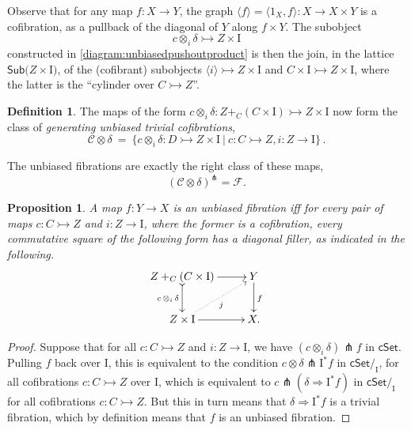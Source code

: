 \documentclass[11pt]{amsart}
\newcommand{\cSet}{\ensuremath{\mathsf{cSet}}}
\newcommand{\mono}{\ensuremath{\rightarrowtail}}
\newcommand{\ra}{\ensuremath{\rightarrow}}
\renewcommand{\to}{\ensuremath{\rightarrow}}
\newcommand{\gph}[1]{\ensuremath{\langle #1 \rangle}}
\newcommand{\Sub}[1]{\ensuremath{\mathsf{Sub}{#1}}}
\newcommand{\I}{\ensuremath{\mathrm{I}}}
\newtheorem{proposition}[theorem]{Proposition}
\theoremstyle{remark}
\theoremstyle{definition}
\newtheorem{definition}[theorem]{Definition}
\begin{document}
Observe that for any map $f : X\to Y$, the graph $\gph{f} = \langle 1_X, f \rangle : X \to X\times Y$ is a cofibration, as a pullback of the diagonal of $Y$ along $f\times Y$.  The subobject $$c \otimes_i\!\delta \mono Z\times \I$$ constructed in \eqref{diagram:unbiasedpushoutproduct} is then the join, in the lattice $\Sub(Z\times \I)$, of the (cofibrant) subobjects $\gph{i} \mono Z\times \I$ and $C\times \I \mono Z\times \I$, where the latter is the ``cylinder over $C\mono Z$''.

\begin{definition}\label{def:genunbiasedtrivcof}
The maps of the form $c\otimes_i\delta : Z +_C (C\times\I) \mono Z\times\I$  now form the class of \emph{generating unbiased trivial cofibrations},
\begin{equation}\label{eq:generatingtrivialcofibrations}
\mathcal{C}\otimes\delta\ =\ \{ c \otimes_i \delta : D \mono Z \times \I\ |\ c : C\mono Z, i:Z\ra\I \}\,.
\end{equation}
\end{definition}

The unbiased fibrations are exactly the right class of these maps,
\[
(\mathcal{C}\otimes\delta)^{\pitchfork} = \mathcal{F}.
\]
\begin{proposition}\label{prop:fibiffrlp}
A map $f: Y\ra X$ is an unbiased fibration iff for every pair of maps $c : C\mono Z$ and $i:Z\ra\I$, where the former is a cofibration, every commutative square of the following form has a diagonal filler, as indicated in the following.
\begin{equation}\label{diagram:unbiasedfibration}
\xymatrix{
Z +_C (C\times\I) \ar@{>->}[d]_{c\, \otimes_i\, \delta} \ar[r] & Y \ar[d]^f \\
Z\times \I \ar@{.>}[ru]_{j} \ar[r] & X.
}
\end{equation}
\end{proposition}

\begin{proof}
Suppose that for all $c : C\mono Z$ and $i:Z\ra\I$, we have $(c\otimes_i\delta) \pitchfork f$ in $\cSet$. Pulling $f$ back over $\I$, this is equivalent to the condition $c\otimes\delta \pitchfork \I^*f$ in $\cSet/_\I$, for all cofibrations $c : C\mono Z$ over $\I$, which is equivalent to $c\pitchfork(\delta\Rightarrow \I^*f)$ in $\cSet/_\I$ for all cofibrations $c : C\mono Z$.  But this in turn means that $\delta\Rightarrow\I^*f$ is a trivial fibration, which by definition means that $f$ is an unbiased fibration.
\end{proof}
\end{document}
